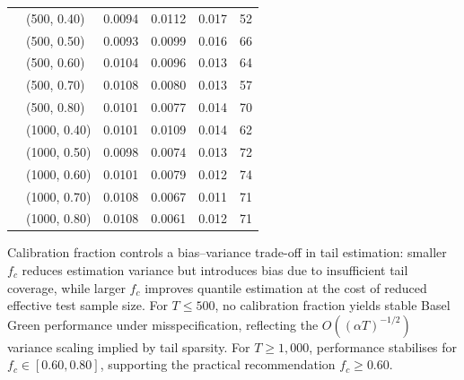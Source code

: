 \begin{table}[H]
\begin{tabular}{@{}llcccc@{}}
		\addlinespace
		& (500, 0.40) & 0.0094 & 0.0112 & 0.017 & 52 \\
		& (500, 0.50) & 0.0093 & 0.0099 & 0.016 & 66 \\
		& (500, 0.60) & 0.0104 & 0.0096 & 0.013 & 64 \\
		& (500, 0.70) & 0.0108 & 0.0080 & 0.013 & 57 \\
		& (500, 0.80) & 0.0101 & 0.0077 & 0.014 & 70 \\
		\addlinespace
		& (1000, 0.40) & 0.0101 & 0.0109 & 0.014 & 62 \\
		& (1000, 0.50) & 0.0098 & 0.0074 & 0.013 & 72 \\
		& (1000, 0.60) & 0.0101 & 0.0079 & 0.012 & 74 \\
		& (1000, 0.70) & 0.0108 & 0.0067 & 0.011 & 71 \\
		& (1000, 0.80) & 0.0108 & 0.0061 & 0.012 & 71 \\
		\hline\hline
	\end{tabular}

	\begin{minipage}{\linewidth}\footnotesize
		\smallskip
		Calibration fraction controls a bias--variance trade-off in tail estimation: smaller $f_c$ reduces estimation variance but introduces bias due to insufficient tail coverage, while larger $f_c$ improves quantile estimation at the cost of reduced effective test sample size. For $T \leq 500$, no calibration fraction yields stable Basel Green performance under misspecification, reflecting the $O((\alpha T)^{-1/2})$ variance scaling implied by tail sparsity. For $T \geq 1{,}000$, performance stabilises for $f_c \in [0.60, 0.80]$, supporting the practical recommendation $f_c \geq 0.60$.
	\end{minipage}
\end{table}